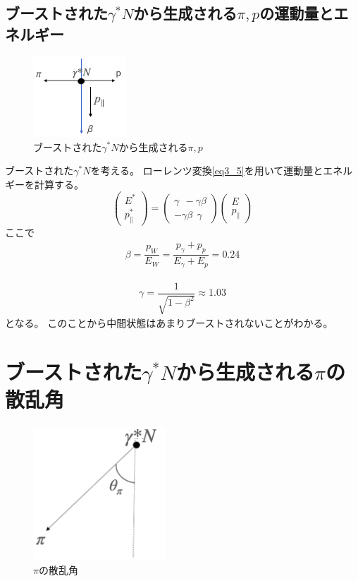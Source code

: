 \subsection{ブーストされた$\gamma^* N$から生成される$\pi,p$の運動量とエネルギー}
\begin{figure}[H]
    \centering
    \includegraphics[height=3cm]{img/boost_middle_situation.png}
    \caption{ブーストされた$\gamma^* N$から生成される$\pi,p$}
    \label{fig:angle6}
\end{figure}
ブーストされた$\gamma^* N$を考える。
ローレンツ変換\ref{eq3_5}を用いて運動量とエネルギーを計算する。
\begin{equation}
    \label{eq3_5}
    \left(\begin{array}{c}
            E^* \\
            p^*_\parallel
        \end{array}\right)
    =\left(\begin{array}{cc}
            \gamma \ \ -\gamma \beta \\
            -\gamma \beta  \ \  \gamma
        \end{array}\right)
    \left(\begin{array}{c}
            E \\
            p_\parallel
        \end{array}\right)
\end{equation}
ここで
\begin{eqnarray}
    \beta = \dfrac{p_W}{E_W} = \dfrac{p_\gamma + p_p}{E_\gamma + E_p} = 0.24
\end{eqnarray}

\begin{eqnarray}
    \gamma = \dfrac{1}{\sqrt{1 - \beta^2}} \approx 1.03
\end{eqnarray}
となる。
このことから中間状態はあまりブーストされないことがわかる。

\section{\texorpdfstring{ブーストされた$\gamma^* N$から生成される$\pi$の散乱角}{LG}}
\begin{figure}[H]
    \centering
    \includegraphics[height=5cm]{img/theta_pi.png}
    \caption{$\pi$の散乱角}
    \label{fig:angle7}
\end{figure}

